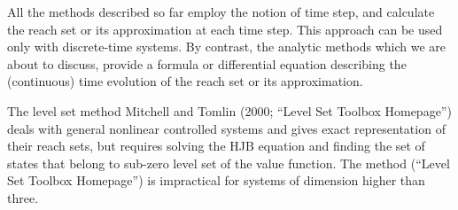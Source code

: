 \documentclass[letterpaper,10pt,english]{sphinxmanual}
\begin{document}
All the methods described so far employ the notion of time step, and
calculate the reach set or its approximation at each time step. This
approach can be used only with discrete-time systems. By contrast, the
analytic methods which we are about to discuss, provide a formula or
differential equation describing the (continuous) time evolution of the
reach set or its approximation.

The level set method Mitchell and Tomlin (2000; “Level Set Toolbox
Homepage”) deals with general nonlinear controlled systems and gives
exact representation of their reach sets, but requires solving the HJB
equation and finding the set of states that belong to sub-zero level set
of the value function. The method (“Level Set Toolbox Homepage”) is
impractical for systems of dimension higher than three.
\end{document}
